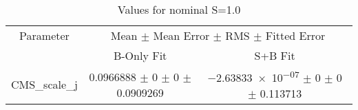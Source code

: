 \begin{table}
\centering
\caption{Values for nominal S=1.0}
\begin{tabular}{ccc}
\toprule
Parameter & \multicolumn{2}{c}{Mean $\pm$ Mean Error $\pm$ RMS $\pm$ Fitted Error}\\
 & B-Only Fit & S+B Fit\\
\midrule
CMS\_scale\_j & \num{0.0966888} $\pm$ \num{0} $\pm$ \num{0} $\pm$ \num{0.0909269} & \num{-2.63833e-07} $\pm$ \num{0} $\pm$ \num{0} $\pm$ \num{0.113713}\\
\bottomrule
\end{tabular}
\end{table}